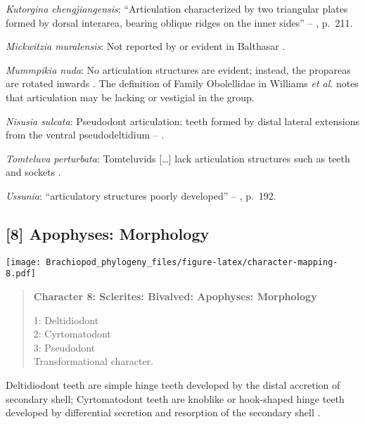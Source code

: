 \documentclass[openany]{book}
\theoremstyle{definition}
\theoremstyle{definition}
\theoremstyle{definition}
\theoremstyle{remark}
\begin{document}
\hypertarget{Kutorgina_chengjiangensis-coding-7}{}
\emph{Kutorgina chengjiangensis}: ``Articulation characterized by two
triangular plates formed by dorsal interarea, bearing oblique ridges on
the inner sides'' -- \citet{Williams2000LinguliformeaCraniiformea},
p.~211.

\hypertarget{Mickwitzia_muralensis-coding-7}{}
\emph{Mickwitzia muralensis}: Not reported by or evident in Balthasar
\citeyearpar{Balthasar2004Shellstructure}.

\hypertarget{Mummpikia_nuda-coding-7}{}
\emph{Mummpikia nuda}: No articulation structures are evident; instead,
the propareas are rotated inwards \citep{Balthasar2008iMummpikia}. The
definition of Family Obolellidae in Williams \emph{et al}.
\citeyearpar{Williams2000LinguliformeaCraniiformea} notes that
articulation may be lacking or vestigial in the group.

\hypertarget{Nisusia_sulcata-coding-7}{}
\emph{Nisusia sulcata}: Pseudodont articulation: teeth formed by distal
lateral extensions from the ventral pseudodeltidium --
\citet{Holmer2018Evolutionarysignificance}.

\hypertarget{Tomteluva_perturbata-coding-7}{}
\emph{Tomteluva perturbata}: Tomteluvids {[}\ldots{}{]} lack
articulation structures such as teeth and sockets
\citep{Streng2016Anew}.

\hypertarget{Ussunia-coding-7}{}
\emph{Ussunia}: ``articulatory structures poorly developed'' --
\citet{Williams2000LinguliformeaCraniiformea}, p.~192.

\subsection*{{[}8{]} Apophyses: Morphology}\label{apophyses-morphology}

\texttt{[image: Brachiopod\_phylogeny\_files/figure-latex/character-mapping-8.pdf]}

\begin{quote}
\textbf{Character 8: Sclerites: Bivalved: Apophyses: Morphology}

1: Deltidiodont\\
2: Cyrtomatodont\\
3: Pseudodont\\
Transformational character.
\end{quote}

Deltidiodont teeth are simple hinge teeth developed by the distal
accretion of secondary shell; Cyrtomatodont teeth are knoblike or
hook-shaped hinge teeth developed by differential secretion and
resorption of the secondary shell \citep[fig. 322
in][]{Williams2000LinguliformeaCraniiformea}.
\end{document}
